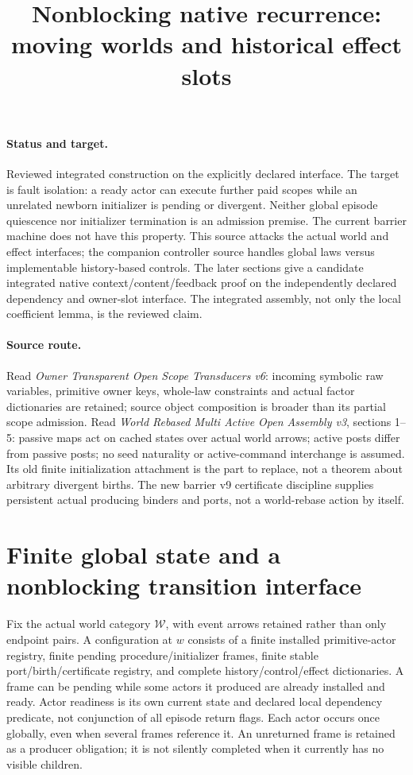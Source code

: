 \documentclass[11pt]{article}\usepackage{amsmath,amssymb,amsthm}
\title{Nonblocking native recurrence: moving worlds and historical effect slots}
\begin{document}
\maketitle
\paragraph{Status and target.} Reviewed integrated construction on the explicitly declared interface. The target is fault isolation: a ready actor can execute further paid scopes while an unrelated newborn initializer is pending or divergent. Neither global episode quiescence nor initializer termination is an admission premise. The current barrier machine does not have this property. This source attacks the actual world and effect interfaces; the companion controller source handles global laws versus implementable history-based controls. The later sections give a candidate integrated native context/content/feedback proof on the independently declared dependency and owner-slot interface. The integrated assembly, not only the local coefficient lemma, is the reviewed claim.

\paragraph{Source route.} Read \emph{Owner Transparent Open Scope Transducers v6}: incoming symbolic raw variables, primitive owner keys, whole-law constraints and actual factor dictionaries are retained; source object composition is broader than its partial scope admission. Read \emph{World Rebased Multi Active Open Assembly v3}, sections 1--5: passive maps act on cached states over actual world arrows; active posts differ from passive posts; no seed naturality or active-command interchange is assumed. Its old finite initialization attachment is the part to replace, not a theorem about arbitrary divergent births. The new barrier v9 certificate discipline supplies persistent actual producing binders and ports, not a world-rebase action by itself.

\section{Finite global state and a nonblocking transition interface}
Fix the actual world category $\mathcal W$, with event arrows retained rather than only endpoint pairs. A configuration at $w$ consists of a finite installed primitive-actor registry, finite pending procedure/initializer frames, finite stable port/birth/certificate registry, and complete history/control/effect dictionaries. A frame can be pending while some actors it produced are already installed and ready. Actor readiness is its own current state and declared local dependency predicate, not conjunction of all episode return flags. Each actor occurs once globally, even when several frames reference it. An unreturned frame is retained as a producer obligation; it is not silently completed when it currently has no visible children.
\end{document}
